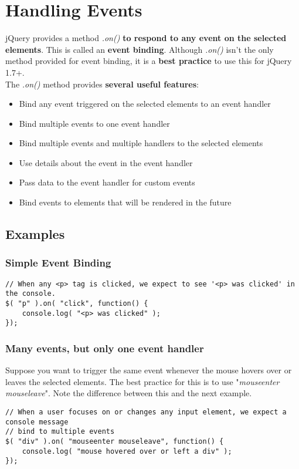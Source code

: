 \documentclass[10pt,letterpaper]{report}
\begin{document}
\section{Handling Events}
jQuery provides a method \textit{.on()} \textbf{to respond to any event on the selected elements}. This is called an \textbf{event binding}. Although \textit{.on()} isn't the only method provided for event binding, it is a \textbf{best practice} to use this for jQuery 1.7+.\\
The \textit{.on()} method provides \textbf{several useful features}:
\begin{itemize}
\item Bind any event triggered on the selected elements to an event handler
\item Bind multiple events to one event handler
\item Bind multiple events and multiple handlers to the selected elements
\item Use details about the event in the event handler
\item Pass data to the event handler for custom events
\item Bind events to elements that will be rendered in the future
\end{itemize}
\subsection{Examples}
\subsubsection{Simple Event Binding}
\begin{lstlisting}
// When any <p> tag is clicked, we expect to see '<p> was clicked' in the console.
$( "p" ).on( "click", function() {
	console.log( "<p> was clicked" );
});
\end{lstlisting}
\subsubsection{Many events, but only one event handler}
Suppose you want to trigger the same event whenever the mouse hovers over or leaves the selected elements. The best practice for this is to use "\textit{mouseenter mouseleave}". Note the difference between this and the next example.
\begin{lstlisting}
// When a user focuses on or changes any input element, we expect a console message
// bind to multiple events
$( "div" ).on( "mouseenter mouseleave", function() {
	console.log( "mouse hovered over or left a div" );
});
\end{lstlisting}
\end{document}
